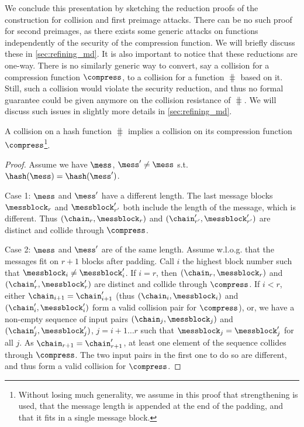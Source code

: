 We conclude this presentation by sketching the reduction proofs of the construction for collision and first preimage attacks. There can be no such proof
for second preimages, as there exists some generic attacks on \merkdam functions independently of the security of the compression function. We will
briefly discuss these in \autoref{sec:refining_md}.
It is also important to notice that these reductions are one-way. There is no similarly generic way to convert, say a collision for a compression function $\compress$,
to a collision for a \merkdam function $\hash$ based on it. Still, such a collision would violate the security reduction, and thus no formal guarantee could be given
anymore on the collision resistance of $\hash$. We will discuss such issues in slightly more details in \autoref{sec:refining_md}.

\begin{prop}
A collision on a \merkdam hash function $\hash$ implies a collision on its compression function $\compress$\footnote{Without losing much generality, we assume in this proof
that \merkdam strengthening is used, that the message length is appended at the end of the padding, and that it fits in a single message block.}.
\end{prop}
\begin{proof}
Assume we have $\mess$, $\mess' \neq \mess$ s.t. $\hash(\mess) = \hash(\mess')$.

Case 1: $\mess$ and $\mess'$ have a different length.
The last message blocks $\messblock_r$ and $\messblock'_{r'}$ both include the length
of the message, which is different. Thus $(\chain_r,\messblock_r)$ and $(\chain'_{r'}, \messblock'_{r'})$ are distinct and collide through $\compress$.

Case 2: $\mess$ and $\mess'$ are of the same length. Assume w.l.o.g. that the messages fit on $r + 1$ blocks after padding.
Call $i$ the highest block number such that $\messblock_{i} \neq \messblock'_{i}$. If $i = r$, then $(\chain_r,\messblock_r)$ and $(\chain'_{r}, \messblock'_{r})$
are distinct and collide through $\compress$. If $i < r$, either $\chain_{i+1} = \chain'_{i+1}$ (thus $(\chain_i,\messblock_i)$ and $(\chain'_{i}, \messblock'_{i})$
form a valid collision pair for $\compress$), or, we have a non-empty sequence of input pairs $(\chain_j, \messblock_j)$ and $(\chain'_j, \messblock'_j)$,
$j = i+1\ldots r$ such that $\messblock_j = \messblock'_j$ for all $j$. As $\chain_{r+1} = \chain'_{r+1}$, at least one element of the sequence
collides through $\compress$. The two input pairs in the first one to do so are different, and thus form a valid collision for $\compress$.
\end{proof}


